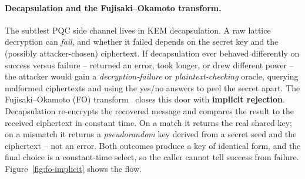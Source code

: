 \paragraph{Decapsulation and the Fujisaki--Okamoto transform.}
The subtlest PQC side channel lives in KEM decapsulation. A raw lattice decryption can
\emph{fail}, and whether it failed depends on the secret key and the (possibly
attacker-chosen) ciphertext. If decapsulation ever behaved differently on success
versus failure -- returned an error, took longer, or drew different power -- the
attacker would gain a \emph{decryption-failure} or \emph{plaintext-checking} oracle,
querying malformed ciphertexts and using the yes/no answers to peel the secret apart.
The Fujisaki--Okamoto (FO) transform~\cite{fo1999} closes this door with \textbf{implicit
rejection}. Decapsulation re-encrypts the recovered message and compares the result to
the received ciphertext in constant time. On a match it returns the real shared key;
on a mismatch it returns a \emph{pseudorandom} key derived from a secret seed and the
ciphertext -- not an error. Both outcomes produce a key of identical form, and the
final choice is a constant-time select, so the caller cannot tell success from
failure. Figure~\ref{fig:fo-implicit} shows the flow.

